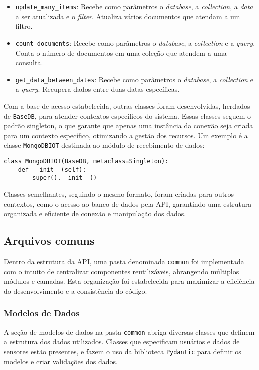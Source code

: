 \begin{itemize}
    \item \texttt{update\_many\_items}: Recebe como parâmetros o \textit{database}, a \textit{collection}, a \textit{data} a ser atualizada e o \textit{filter}. Atualiza vários documentos que atendam a um filtro.
    
    \item \texttt{count\_documents}: Recebe como parâmetros o \textit{database}, a \textit{collection} e a \textit{query}. Conta o número de documentos em uma coleção que atendem a uma consulta.
    
    \item \texttt{get\_data\_between\_dates}: Recebe como parâmetros o \textit{database}, a \textit{collection} e a \textit{query}. Recupera dados entre duas datas específicas.
\end{itemize}


Com a base de acesso estabelecida, outras classes foram desenvolvidas, herdados de \texttt{BaseDB}, para atender contextos específicos do sistema. Essas classes seguem o padrão singleton, o que garante que apenas uma instância da conexão seja criada para um contexto específico, otimizando a gestão dos recursos. Um exemplo é a classe \texttt{MongoDBIOT} destinada ao módulo de recebimento de dados:

\begin{verbatim}
class MongoDBIOT(BaseDB, metaclass=Singleton):
    def __init__(self):
        super().__init__()
\end{verbatim}

Classes semelhantes, seguindo o mesmo formato, foram criadas para outros contextos, como o acesso ao banco de dados pela API, garantindo uma estrutura organizada e eficiente de conexão e manipulação dos dados.

\subsection{Arquivos comuns}\label{subsec:commum}

Dentro da estrutura da API, uma pasta denominada \texttt{common} foi implementada com o intuito de centralizar componentes reutilizáveis, abrangendo múltiplos módulos e camadas. Esta organização foi estabelecida para maximizar a eficiência do desenvolvimento e a consistência do código.

\subsubsection{Modelos de Dados}\label{subsubsec:dataModel}
A seção de modelos de dados na pasta \texttt{common} abriga diversas classes que definem a estrutura dos dados utilizados. Classes que especificam usuários e dados de sensores estão presentes, e fazem o uso da biblioteca \texttt{Pydantic} para definir os modelos e criar validações dos dados.

